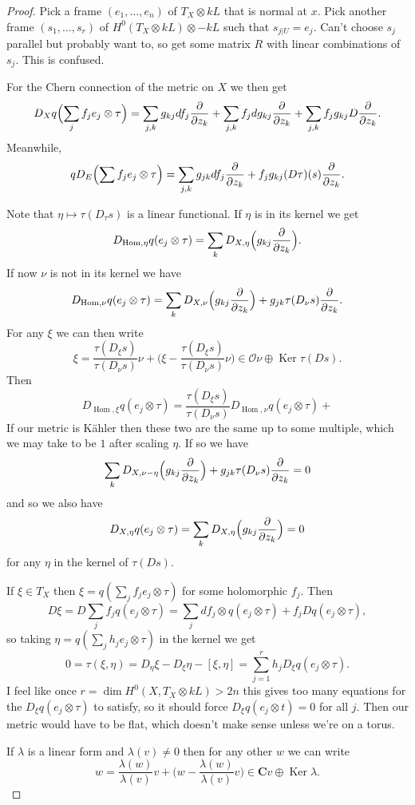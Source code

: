 \documentclass[12pt]{amsart}
\theoremstyle{definition}
\newcommand{\cc}[1]{\mathcal{#1}}
\def\CC{\mathbf{C}}
\DeclareMathOperator{\Ker}{Ker}
\DeclareMathOperator{\Hom}{Hom}
\begin{document}
\begin{proof}
Pick a frame $(e_1, \ldots, e_n)$ of $T_X \otimes kL$ that is normal at $x$.
Pick another frame $(s_1, \ldots, s_r)$ of $H^0(T_X \otimes kL) \otimes -kL$ such that $s_{j|U} = e_j$.
Can't choose $s_j$ parallel but probably want to, so get some matrix $R$ with linear combinations of $s_j$.
This is confused.





For the Chern connection of the metric on $X$ we then get
\[
D_X q\Bigl(\sum_{j} f_j e_{j} \otimes \tau \Bigr) 
= \sum_{j,k} g_{kj} df_j \frac{\partial}{\partial z_k}
+ \sum_{j,k} f_j dg_{kj} \frac{\partial}{\partial z_k}
+ \sum_{j,k} f_j g_{kj} D\frac{\partial}{\partial z_k}.
\]
Meanwhile,
\[
q D_E\Bigl( \sum f_j e_j \otimes \tau \Bigr)
= \sum_{j,k} g_{jk} d f_j \frac{\partial}{\partial z_k}
+ f_j g_{kj} (D \tau)(s) \frac{\partial}{\partial z_k} .
\]


Note that $\eta \mapsto \tau(D_\tau s)$ is a linear functional.
If $\eta$ is in its kernel we get
\[
D_{\Hom,\eta}q ( e_j \otimes \tau )
= \sum_{k} D_{X,\eta}\Bigl(g_{kj} \frac{\partial}{\partial z_k}\Bigr).
\]
If now $\nu$ is not in its kernel we have
\[
D_{\Hom,\nu}q ( e_j \otimes \tau )
= \sum_{k} D_{X,\nu}\Bigl(g_{kj} \frac{\partial}{\partial z_k}\Bigr)
+ g_{jk} \tau(D_\nu s) \frac{\partial}{\partial z_k}.
\]
For any $\xi$ we can then write
\[
\xi = \frac{\tau(D_\xi s)}{\tau(D_\nu s)} \nu
+ \biggl(\xi - \frac{\tau(D_\xi s)}{\tau(D_\nu s)} \nu \biggr)
\in \cc O \nu \oplus \Ker \tau(Ds).
\]
Then
\[
D_{\Hom,\xi} q(e_j \otimes \tau)
= \frac{\tau(D_\xi s)}{\tau(D_\nu s)} D_{\Hom,\nu} q(e_j \otimes \tau)
+
\]
If our metric is K\"ahler then these two are the same up to some multiple, which we may take to be $1$ after scaling $\eta$.
If so we have
\[
\sum_{k} D_{X,\nu-\eta}\Bigl(g_{kj} \frac{\partial}{\partial z_k}\Bigr)
+ g_{jk} \tau(D_\nu s) \frac{\partial}{\partial z_k}
= 0
\]
and so we also have
\[
D_{X,\eta} q(e_j \otimes \tau)
= \sum_{k} D_{X,\eta}\Bigl(g_{kj} \frac{\partial}{\partial z_k}\Bigr)
= 0
\]
for any $\eta$ in the kernel of $\tau(D s)$.

If $\xi \in T_X$ then $\xi = q(\sum_j f_j e_j \otimes \tau)$ for some holomorphic $f_j$.
Then
\[
D \xi 
= D \sum_j f_j q(e_j \otimes \tau)
= \sum_j df_j \otimes q(e_j \otimes \tau)
+ f_j D q(e_j \otimes \tau),
\]
so taking $\eta = q(\sum_j h_j e_j \otimes \tau)$ in the kernel we get
\[
0 
= \tau(\xi,\eta) 
= D_\eta \xi - D_\xi \eta - [\xi, \eta]
= \sum_{j=1}^r h_j D_\xi q(e_j \otimes \tau).
\]
I feel like once $r = \dim H^0(X, T_X \otimes kL) > 2n$ this gives too many equations for the $D_\xi q(e_j \otimes \tau)$ to satisfy, so it should force $D_\xi q(e_j \otimes t) = 0$ for all $j$.
Then our metric would have to be flat, which doesn't make sense unless we're on a torus.

If $\lambda$ is a linear form and $\lambda(v) \not= 0$ then for any other $w$ we can write
\[
w = \frac{\lambda(w)}{\lambda(v)} v
+ \biggl( w - \frac{\lambda(w)}{\lambda(v)} v \biggr)
\in \CC v \oplus \Ker \lambda.
\]
\end{proof}
\end{document}
